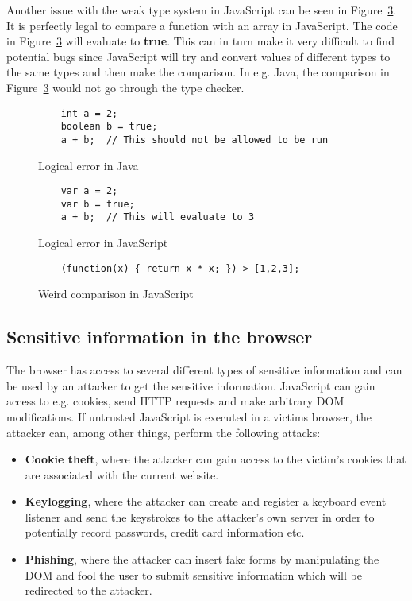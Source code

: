 Another issue with the weak type system in JavaScript can be seen in Figure~\ref{fig:js_comparison}. It is perfectly legal to compare a function with an array in JavaScript. The code in Figure~\ref{fig:js_comparison} will evaluate to \textbf{true}. This can in turn make it very difficult to find potential bugs since JavaScript will try and convert values of different types to the same types and then make the comparison. In e.g. Java, the comparison in Figure~\ref{fig:js_comparison} would not go through the type checker.
\begin{figure}[h]
  \begin{verbatim}
    int a = 2;
    boolean b = true;
    a + b;  // This should not be allowed to be run
  \end{verbatim}
  \caption{Logical error in Java}
  \label{fig:error_java}
\end{figure}
\begin{figure}[h]
  \begin{verbatim}
    var a = 2;
    var b = true;
    a + b;  // This will evaluate to 3
  \end{verbatim}
  \caption{Logical error in JavaScript}
  \label{fig:error_js}
\end{figure}
\begin{figure}[h]
  \begin{verbatim}
    (function(x) { return x * x; }) > [1,2,3];
  \end{verbatim}
  \caption{Weird comparison in JavaScript}
  \label{fig:js_comparison}
\end{figure}

\subsection{Sensitive information in the browser}
The browser has access to several different types of sensitive information and can be used by an attacker to get the sensitive information. JavaScript can gain access to e.g. cookies, send HTTP requests and make arbitrary DOM modifications. If untrusted JavaScript is executed in a victims browser, the attacker can, among other things, perform the following attacks:
\begin{itemize}
  \item \textbf{Cookie theft}, where the attacker can gain access to the victim's cookies that are associated with the current website.
  \item \textbf{Keylogging}, where the attacker can create and register a keyboard event listener and send the keystrokes to the attacker's own server in order to potentially record passwords, credit card information etc.
  \item \textbf{Phishing}, where the attacker can insert fake forms by manipulating the DOM and fool the user to submit sensitive information which will be redirected to the attacker.
\end{itemize}
